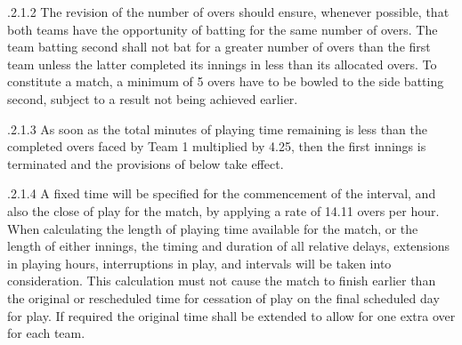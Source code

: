 \documentclass[12pt]{article}
\begin{document}
\vspace{\baselineskip}
\begin{adjustwidth}{1.97in}{0.08in}
{\fontsize{9pt}{10.8pt}.2.1.2 \tabto{1.96in} The revision of the number of overs should ensure, whenever possible, that both teams have the opportunity of batting for the same number of overs. The team batting second shall not bat for a greater number of overs than the first team unless the latter completed its innings in less than its allocated overs. To constitute a match, a minimum of 5 overs have to be bowled to the side batting second, subject to a result not being achieved earlier.\par}\par

\end{adjustwidth}


\vspace{\baselineskip}
\begin{adjustwidth}{1.97in}{0.06in}
\begin{justify}
{\fontsize{9pt}{10.8pt}.2.1.3 \tabto{1.96in} As soon as the total minutes of playing time remaining is less than the completed overs faced by Team 1 multiplied by 4.25, then the first innings is terminated and the provisions of below take effect.\par}
\end{justify}\par

\end{adjustwidth}


\vspace{\baselineskip}
\begin{adjustwidth}{1.97in}{0.08in}
{\fontsize{9pt}{10.8pt}.2.1.4 \tabto{1.96in} A fixed time will be specified for the commencement of the interval, and also the close of play for the match, by applying a rate of 14.11 overs per hour. When calculating the length of playing time available for the match, or the length of either innings, the timing and duration of all relative delays, extensions in playing hours, interruptions in play, and intervals will be taken into consideration. This calculation must not cause the match to finish earlier than the original or rescheduled time for cessation of play on the final scheduled day for play. If required the original time shall be extended to allow for one extra over for each team.\par}\par

\end{adjustwidth}
\end{document}
